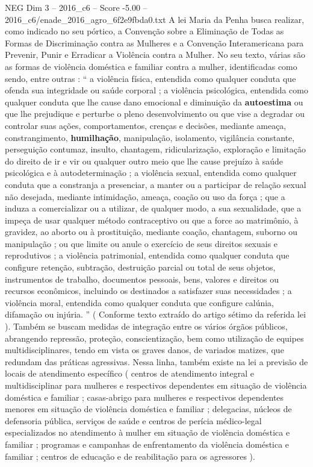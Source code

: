 \begin{textsample}{NEG Dim 3 – 2016\_c6 – Score -5.00 – 2016\_c6/enade\_2016\_agro\_6f2e9fbda0.txt}
A lei Maria da Penha busca realizar, como indicado no seu pórtico, a Convenção sobre a Eliminação de Todas as Formas de Discriminação contra as Mulheres e a Convenção Interamericana para Prevenir, Punir e Erradicar a Violência contra a Mulher.
No seu texto, várias são as formas de violência doméstica e familiar contra a mulher, identificadas como sendo, entre outras : “ a violência física, entendida como qualquer conduta que ofenda sua integridade ou saúde corporal ; a violência psicológica, entendida como qualquer conduta que lhe cause dano emocional e diminuição da \textbf{autoestima} ou que lhe prejudique e perturbe o pleno desenvolvimento ou que vise a degradar ou controlar suas ações, comportamentos, crenças e decisões, mediante ameaça, constrangimento, \textbf{humilhação}, manipulação, isolamento, vigilância constante, perseguição contumaz, insulto, chantagem, ridicularização, exploração e limitação do direito de ir e vir ou qualquer outro meio que lhe cause prejuízo à saúde psicológica e à autodeterminação ; a violência sexual, entendida como qualquer conduta que a constranja a presenciar, a manter ou a participar de relação sexual não desejada, mediante intimidação, ameaça, coação ou uso da força ; que a induza a comercializar ou a utilizar, de qualquer modo, a sua sexualidade, que a impeça de usar qualquer método contraceptivo ou que a force ao matrimônio, à gravidez, ao aborto ou à prostituição, mediante coação, chantagem, suborno ou manipulação ; ou que limite ou anule o exercício de seus direitos sexuais e reprodutivos ; a violência patrimonial, entendida como qualquer conduta que configure retenção, subtração, destruição parcial ou total de seus objetos, instrumentos de trabalho, documentos pessoais, bens, valores e direitos ou recursos econômicos, incluindo os destinados a satisfazer suas necessidades ; a violência moral, entendida como qualquer conduta que configure calúnia, difamação ou injúria. ” ( Conforme texto extraído do artigo sétimo da referida lei ).
Também se buscam medidas de integração entre os vários órgãos públicos, abrangendo repressão, proteção, conscientização, bem como utilização de equipes multidisciplinares, tendo em vista os graves danos, de variados matizes, que redundam das práticas agressivas.
Nessa linha, também existe na lei a previsão de locais de atendimento específico ( centros de atendimento integral e multidisciplinar para mulheres e respectivos dependentes em situação de violência doméstica e familiar ; casas-abrigo para mulheres e respectivos dependentes menores em situação de violência doméstica e familiar ; delegacias, núcleos de defensoria pública, serviços de saúde e centros de perícia médico-legal especializados no atendimento à mulher em situação de violência doméstica e familiar ; programas e campanhas de enfrentamento da violência doméstica e familiar ; centros de educação e de reabilitação para os agressores ).

\end{textsample}
